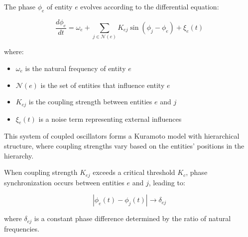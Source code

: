 \begin{definition}
The phase $\phi_e$ of entity $e$ evolves according to the differential equation:

\begin{equation}
\frac{d\phi_e}{dt} = \omega_e + \sum_{j \in \mathcal{N}(e)} K_{ej} \sin(\phi_j - \phi_e) + \xi_e(t)
\end{equation}

where:
\begin{itemize}
    \item $\omega_e$ is the natural frequency of entity $e$
    \item $\mathcal{N}(e)$ is the set of entities that influence entity $e$
    \item $K_{ej}$ is the coupling strength between entities $e$ and $j$
    \item $\xi_e(t)$ is a noise term representing external influences
\end{itemize}
\end{definition}

This system of coupled oscillators forms a Kuramoto model with hierarchical structure, where coupling strengths vary based on the entities' positions in the hierarchy.

\begin{theorem}
When coupling strength $K_{ej}$ exceeds a critical threshold $K_c$, phase synchronization occurs between entities $e$ and $j$, leading to:

\begin{equation}
|\phi_e(t) - \phi_j(t)| \to \delta_{ej}
\end{equation}

where $\delta_{ej}$ is a constant phase difference determined by the ratio of natural frequencies.
\end{theorem}

